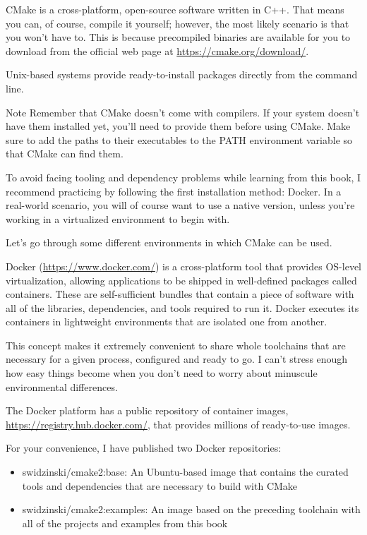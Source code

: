 CMake is a cross-platform, open-source software written in C++. That means you can, of course, compile it yourself; however, the most likely scenario is that you won’t have to. This is because precompiled binaries are available for you to download from the official web page at \url{https://cmake.org/download/}.

Unix-based systems provide ready-to-install packages directly from the command line.

\begin{myNotic}{Note}
Remember that CMake doesn’t come with compilers. If your system doesn’t have them installed yet, you’ll need to provide them before using CMake. Make sure to add the paths to their executables to the PATH environment variable so that CMake can find them.

To avoid facing tooling and dependency problems while learning from this book, I recommend practicing by following the first installation method: Docker. In a real-world scenario, you will of course want to use a native version, unless you’re working in a virtualized environment to begin with.
\end{myNotic}

Let’s go through some different environments in which CMake can be used.


Docker (\url{https://www.docker.com/}) is a cross-platform tool that provides OS-level virtualization, allowing applications to be shipped in well-defined packages called containers. These are self-sufficient bundles that contain a piece of software with all of the libraries, dependencies, and tools required to run it. Docker executes its containers in lightweight environments that are isolated one from another.

This concept makes it extremely convenient to share whole toolchains that are necessary for a given process, configured and ready to go. I can’t stress enough how easy things become when you don’t need to worry about minuscule environmental differences.

The Docker platform has a public repository of container images, \url{https://registry.hub.docker.com/}, that provides millions of ready-to-use images.

For your convenience, I have published two Docker repositories:

\begin{itemize}
\item
swidzinski/cmake2:base: An Ubuntu-based image that contains the curated tools and dependencies that are necessary to build with CMake

\item
swidzinski/cmake2:examples: An image based on the preceding toolchain with all of the projects and examples from this book
\end{itemize}

